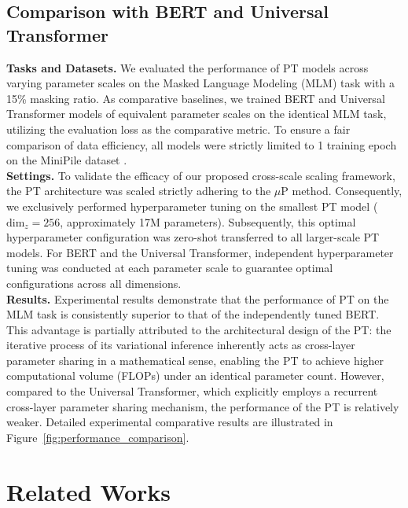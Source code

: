 \documentclass[11pt]{article}
\begin{document}
\subsection{Comparison with BERT and Universal Transformer}

\textbf{Tasks and Datasets.} We evaluated the performance of PT models across varying parameter scales on the Masked Language Modeling (MLM) task with a 15\% masking ratio. As comparative baselines, we trained BERT \cite{devlin2019bert} and Universal Transformer \cite{dehghani2019universal} models of equivalent parameter scales on the identical MLM task, utilizing the evaluation loss as the comparative metric. To ensure a fair comparison of data efficiency, all models were strictly limited to 1 training epoch on the MiniPile dataset \cite{kaddour2023minipile}.\\

\noindent
\textbf{Settings.} To validate the efficacy of our proposed cross-scale scaling framework, the PT architecture was scaled strictly adhering to the $\mu$P method. Consequently, we exclusively performed hyperparameter tuning on the smallest PT model ($\text{dim}_z=256$, approximately 17M parameters). Subsequently, this optimal hyperparameter configuration was zero-shot transferred to all larger-scale PT models. For BERT and the Universal Transformer, independent hyperparameter tuning was conducted at each parameter scale to guarantee optimal configurations across all dimensions.\\

\noindent
\textbf{Results.} Experimental results demonstrate that the performance of PT on the MLM task is consistently superior to that of the independently tuned BERT. This advantage is partially attributed to the architectural design of the PT: the iterative process of its variational inference inherently acts as cross-layer parameter sharing in a mathematical sense, enabling the PT to achieve higher computational volume (FLOPs) under an identical parameter count. However, compared to the Universal Transformer, which explicitly employs a recurrent cross-layer parameter sharing mechanism, the performance of the PT is relatively weaker. Detailed experimental comparative results are illustrated in Figure~\ref{fig:performance_comparison}.

\section{Related Works}
\end{document}
